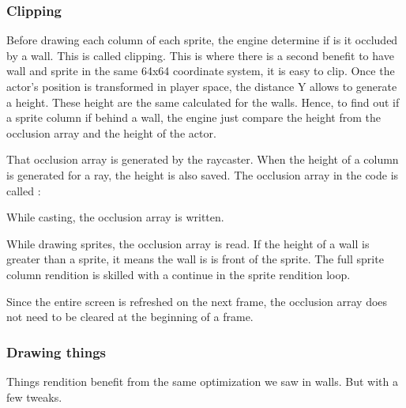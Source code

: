 \subsubsection{Clipping}
Before drawing each column of each sprite, the engine determine if is it occluded by a wall. This is called clipping. This is where there is a second benefit to have wall and sprite in the same 64x64 coordinate system, it is easy to clip. Once the actor's position is transformed in player space, the distance Y allows to generate a height. These height are the same calculated for the walls. Hence, to find out if a sprite column if behind a wall, the engine just compare the height from the occlusion array and the height of the actor.\\
\par
That occlusion array is generated by the raycaster. When the height of a column is generated for a ray, the height is also saved. The occlusion array in the code is called :\\
\par
\begin{minipage}{\textwidth}

\end{minipage}
\par
While casting, the occlusion array is written.\\
\par
\begin{minipage}{\textwidth}

\end{minipage}
While drawing sprites, the occlusion array is read. If the height of a wall is greater than a sprite, it means the wall is is front of the sprite. The full sprite column rendition is skilled with a continue in the sprite rendition loop.\\
\par
\begin{minipage}{\textwidth}

\end{minipage}
\par
Since the entire screen is refreshed on the next frame, the occlusion array does not need to be cleared at the beginning of a frame.





\subsubsection{Drawing things}
Things rendition benefit from the same optimization we saw in walls. But with a few tweaks.

